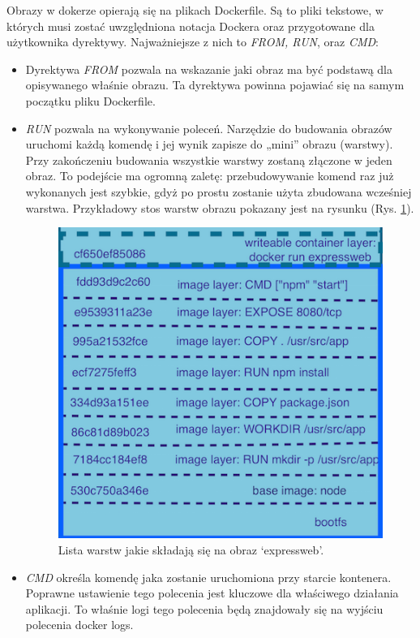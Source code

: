 \documentclass[10pt,a4paper,titlepage,twoside]{report}
\begin{document}
 Obrazy w dokerze opierają się na plikach Dockerfile. Są to pliki tekstowe, w których musi zostać uwzględniona notacja Dockera oraz przygotowane dla użytkownika dyrektywy. Najważniejsze z nich to \textit{FROM, RUN}, oraz \textit{CMD}:

\begin{itemize}
\item Dyrektywa \textit{FROM} pozwala na wskazanie jaki obraz ma być podstawą dla opisywanego właśnie obrazu. Ta dyrektywa powinna pojawiać się na samym początku pliku Dockerfile.
\item \textit{RUN} pozwala na wykonywanie poleceń. Narzędzie do budowania obrazów uruchomi każdą komendę i jej wynik zapisze do „mini” obrazu (warstwy). Przy zakończeniu budowania wszystkie warstwy zostaną złączone w jeden obraz. To podejście ma ogromną zaletę: przebudowywanie komend raz już wykonanych jest szybkie, gdyż po prostu zostanie użyta zbudowana wcześniej warstwa. Przykładowy stos warstw obrazu pokazany jest na rysunku (Rys. \ref{docker_layers}).
\begin{figure}[ht!]
	\centering
	\includegraphics[scale=0.7]{pics/docker_layers.png}
	\caption{Lista warstw jakie składają się na obraz ‘expressweb’.}
	\label{docker_layers}
\end{figure}
\item \textit{CMD} określa komendę jaka zostanie uruchomiona przy starcie kontenera. Poprawne ustawienie tego polecenia jest kluczowe dla właściwego działania aplikacji. To właśnie logi tego polecenia będą znajdowały się na wyjściu polecenia docker logs.
\end{itemize}
\end{document}
